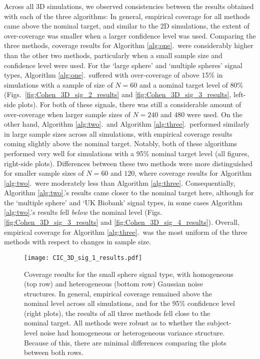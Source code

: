 Across all 3D simulations, we observed consistencies between the results obtained with each of the three algorithms: In general, empirical coverage for all methods came above the nominal target, and similar to the 2D simulations, the extent of over-coverage was smaller when a larger confidence level was used. Comparing the three methods, coverage results for Algorithm \ref{alg:one}.\ were considerably higher than the other two methods, particularly when a small sample size and confidence level were used. For the `large sphere' and `multiple spheres' signal types, Algorithm \ref{alg:one}.\ suffered with over-coverage of above 15\% in simulations with a sample of size of $N = 60$ and a nominal target level of 80\% (Figs.\ \ref{fig:Cohen_3D_sig_2_results} and \ref{fig:Cohen_3D_sig_3_results}, left-side plots). For both of these signals, there was still a considerable amount of over-coverage when larger sample sizes of $N = 240$ and $480$ were used. On the other hand, Algorithm \ref{alg:two}.\ and Algorithm \ref{alg:three}.\ performed similarly in large sample sizes across all simulations, with empirical coverage results coming slightly above the nominal target. Notably, both of these algorithms performed very well for simulations with a 95\% nominal target level (all figures, right-side plots).
Differences between these two methods were more distinguished for smaller sample sizes of $N = 60$ and $120$, where coverage results for Algorithm \ref{alg:two}.\ were moderately less than Algorithm \ref{alg:three}. Consequentially, Algorithm \ref{alg:two}.'s results came closer to the nominal target here, although for the `multiple sphere' and `UK Biobank' signal types, in some cases Algorithm \ref{alg:two}.'s results fell \textit{below} the nominal level (Figs. \ref{fig:Cohen_3D_sig_3_results} and \ref{fig:Cohen_3D_sig_4_results}). Overall, empirical coverage for Algorithm \ref{alg:three}.\ was the most uniform of the three methods with respect to changes in sample size. 

\begin{figure}[!htbp]
\hspace*{-3.0cm}
\centering
    \texttt{[image: CIC\_3D\_sig\_1\_results.pdf]}
\caption{Coverage results for the small sphere signal type, with homogeneous (top row) and heterogeneous (bottom row) Gaussian noise structures. In general, empirical coverage remained above the nominal level across all simulations, and for the 95\% confidence level (right plots), the results of all three methods fell close to the nominal target. All methods were robust as to whether the subject-level noise had homogeneous or heterogeneous variance structure. Because of this, there are minimal differences comparing the plots between both rows.}
\label{fig:Cohen_3D_sig_1_results}
\end{figure}


